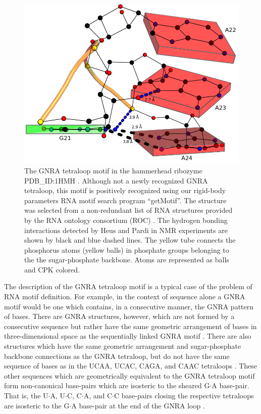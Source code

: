 \begin{figure}
\centering
\includegraphics[angle=0, scale=0.38]{Chapter5/gnra21L2.png}
\caption{The   GNRA  tetraloop  motif   in  the   hammerhead  ribozyme
  PDB\_ID:1HMH \cite{pley1994}.  Although  not a newly recognized GNRA
  tetraloop, this motif is  positively recognized using our rigid-body
  parameters RNA motif search  program ``getMotif''. The structure was
  selected from a non-redundant list of RNA structures provided by the
  RNA  ontology consortium  (ROC)  \cite{leontis2006b}.  The  hydrogen
  bonding interactions  detected by Heus and  Pardi \cite{heus1991} in
  NMR experiments are shown by black and blue dashed lines. The yellow
  tube  connects  the phosphorus  atoms  (yellow  balls) in  phosphate
  groups  belonging to  the the  sugar-phosphate backbone.   Atoms are
  represented as balls and CPK colored.}
\label{fig:gnrablocks}
\end{figure}

The description of  the GNRA tetraloop motif is a  typical case of the
problem  of RNA  motif definition.   For  example, in  the context  of
sequence  alone  a  GNRA motif  would  be  one  which contains,  in  a
consecutive  manner,  the  GNRA  pattern  of bases.   There  are  GNRA
structures, however,  which are not  formed by a  consecutive sequence
but  rather   have  the  same   geometric  arrangement  of   bases  in
three-dimensional  space   as  the  sequentially   linked  GNRA  motif
\cite{lee2003, lemieux2006}.  There are also structures which have the
same geometric arrangement and sugar-phosphate backbone connections as
the GNRA tetraloop,  but do not have the same sequence  of bases as in
the UCAA,  UCAC, CAGA, and CAAC  tetraloops \cite{lemieux2006}.  These
other  sequences  which  are  geometrically  equivalent  to  the  GNRA
tetraloop motif  form non-canonical base-pairs which  are isosteric to
the sheared  G$\cdot$A base-pair.  That is, the  U$\cdot$A, U$\cdot$C,
C$\cdot$A, and C$\cdot$C  base-pairs closing the respective tetraloops
are isosteric to  the G$\cdot$A base-pair at the end  of the GNRA loop
\cite{lemieux2006}.

